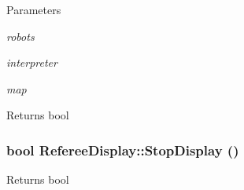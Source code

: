 \begin{DoxyParams}{Parameters}
\item[{\em robots}]\item[{\em interpreter}]\item[{\em map}]\end{DoxyParams}
\begin{DoxyReturn}{Returns}
bool 
\end{DoxyReturn}
\hypertarget{classRefereeDisplay_aafa710132ce88c4e6cb4d430baf26173}{
\subsubsection[{StopDisplay}]{\setlength{\rightskip}{0pt plus 5cm}bool RefereeDisplay::StopDisplay ()}}
\label{classRefereeDisplay_aafa710132ce88c4e6cb4d430baf26173}
\begin{DoxyReturn}{Returns}
bool 
\end{DoxyReturn}


